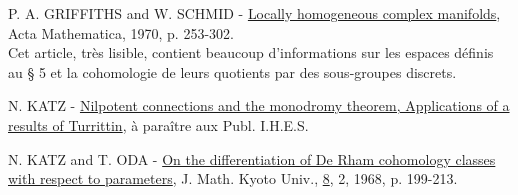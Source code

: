 \documentclass[10pt,leqno]{article}
\theoremstyle{deligne}
\begin{document}
\begin{enumerate}[label={[\arabic*]},leftmargin=2.8em]
\item P. A. GRIFFITHS and W. SCHMID - \uline{Locally homogeneous complex manifolds}, Acta Mathematica, 1970, p. 253-302.\\
Cet article, très lisible, contient beaucoup d'informations sur les espaces définis au § 5 et la cohomologie de leurs quotients par des sous-groupes discrets.

\item N. KATZ - \uline{Nilpotent connections and the monodromy theorem, Applications of a results of Turrittin}, à paraître aux Publ. I.H.E.S.

\item N. KATZ and T. ODA - \uline{On the differentiation of De Rham cohomology classes with respect to parameters}, J. Math. Kyoto Univ., \uline{8}, 2, 1968, p. 199-213.
\end{enumerate}
\end{document}

